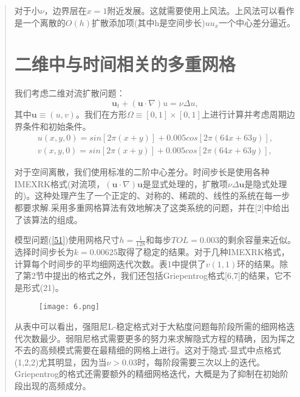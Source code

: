 \documentclass{article}
\begin{document}
\begin{CJK}{UTF8}{gkai}
\begin{quotation}
对于小$\nu $，边界层在$x =1$附近发展。这就需要使用上风法。上风法可以看作是一个离散的$O(h)$扩散添加项(其中h是空间步长)$uu_{x}$一个中心差分逼近。

\section{二维中与时间相关的多重网格}

我们考虑二维对流扩散问题：
\begin{equation}
\mathbf{u}_{t}+(\mathbf{u}\cdot\nabla)u=\nu \Delta u,
\label{51}
\end{equation}
其中$\mathbf{u}\equiv (u,v)$。我们在方形$\varOmega\equiv [0,1]\times [0,1]$上进行计算并考虑周期边界条件和初始条件。
\begin{gather*}
u(x,y,0)=sin[2\pi (x+y)]+0.005cos[2\pi (64x+63y)],\\
v(x,y,0)=sin[2\pi (x+y)]+0.005cos[2\pi (64x+63y)],
\end{gather*}

对于空间离散，我们使用标准的二阶中心差分。时间步长是使用各种IMEXRK格式(对流项，$(\mathbf{u}\cdot\nabla)\mathbf{u}$是显式处理的，扩散项$\nu \Delta\mathbf{u}$是隐式处理的)。这种处理产生了一个正定的、对称的、稀疏的、线性的系统在每一步都要求解.采用多重网格算法有效地解决了这类系统的问题，并在[2]中给出了该算法的组成。

模型问题(\ref{51})使用网格尺寸$h=\frac{1}{128}$和每步$TOL=0.003$的剩余容量来近似。选择时间步长为$k=0.00625$取得了稳定的结果。对于几种IMEXRK格式，计算每个时间步的平均细网迭代次数。表1中提供了$v(1,1)$环的结果。除了第2节中提出的格式之外，我们还包括Griepentrog格式[6,7]的结果，它不是形式(21)。

\begin{figure}[H]
\texttt{[image: 6.png]}
\centering
\label{Table1}
\end{figure}

从表中可以看出，强阻尼L-稳定格式对于大粘度问题每阶段所需的细网格迭代次数最少。弱阻尼格式需要更多的努力来求解隐式方程的精确，因为挥之不去的高频模式需要在最精细的网格上进行。这对于隐式-显式中点格式(1,2,2)尤其明显，因为当$\nu >0.03$时，每阶段需要三次以上的迭代。Griepentrog的格式还需要额外的精细网格迭代，大概是为了抑制在初始阶段出现的高频成分。
\end{quotation}
\end{CJK}
\end{document}

